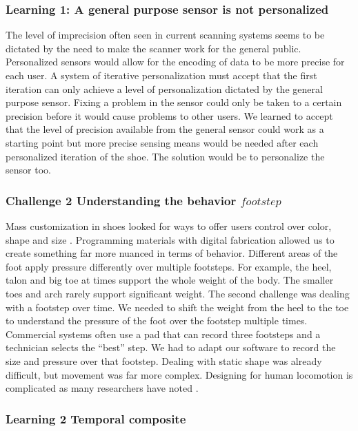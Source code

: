 \subsubsection{Learning 1: A general purpose sensor is not personalized}

The level of imprecision often seen in current scanning systems seems to be dictated by the need to make the scanner work for the general public. Personalized sensors would allow for the encoding of data to be more precise for each user. A system of iterative personalization must accept that the first iteration can only achieve a level of personalization dictated by the general purpose sensor. Fixing a problem in the sensor could only be taken to a certain precision before it would cause problems to other users. We learned to accept that the level of precision available from the general sensor could work as a starting point but more precise sensing means would be needed after each personalized iteration of the shoe. The solution would be to personalize the sensor too.

\subsubsection{Challenge 2 Understanding the behavior \(footstep\)}

Mass customization in shoes looked for ways to offer users control over color, shape and size \cite{Piller2012}. Programming materials with digital fabrication allowed us to create something far more nuanced in terms of behavior. Different areas of the foot apply pressure differently over multiple footsteps. For example, the heel, talon and big toe at times support the whole weight of the body. The smaller toes and arch rarely support significant weight. The second challenge was dealing with a footstep over time. We needed to shift the weight from the heel to the toe to understand the pressure of the foot over the footstep multiple times. Commercial systems often use a pad that can record three footsteps and a technician selects the ``best'' step. We had to adapt our software to record the size and pressure over that footstep. Dealing with static shape was already difficult, but movement was far more complex. Designing for human locomotion is complicated as many researchers have noted \cite{Lindqvist2014,Lindqvist2015,Bickel2010}.  

\subsubsection{Learning 2 Temporal composite}

